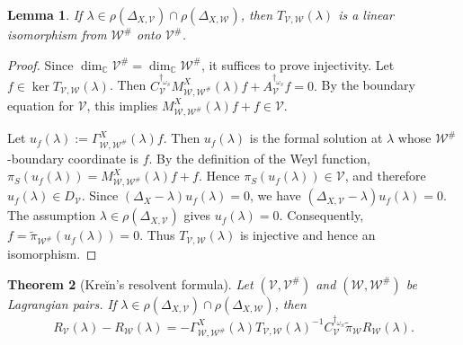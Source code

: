 \documentclass[12pt]{amsart}
\theoremstyle{plain}
\newtheorem{thm}{Theorem}[section]
\newtheorem{lem}[thm]{Lemma}
\theoremstyle{definition}
\theoremstyle{remark}
\numberwithin{equation}{section} \numberwithin{figure}{section}
\newcommand{\mb}[1]{\mathbb{#1}} %
\begin{document}
\begin{lem}\label{lem:boundary-operator-invertible}
If
\(\lambda\in
\rho(\Delta_{X,\mathcal V})
\cap\rho(\Delta_{X,\mathcal W})\), then
\(T_{\mathcal V,\mathcal W}(\lambda)\) is a linear isomorphism from
\(\mathcal W^\#\) onto \(\mathcal V^\#\).
\end{lem}

\begin{proof}
Since
\(\dim_{\mb C}\mathcal V^\#
=\dim_{\mb C}\mathcal W^\#\), it suffices to prove injectivity.
Let \(f\in\ker T_{\mathcal V,\mathcal W}(\lambda)\). Then
\(
C_{\mathcal V}^{\dagger_{\omega_S}}
M_{\mathcal W,\mathcal W^\#}^{X}(\lambda)f
+
A_{\mathcal V}^{\dagger_{\omega_S}}f
=0.
\)
By the boundary equation for \(\mathcal V\), this implies
\(
M_{\mathcal W,\mathcal W^\#}^{X}(\lambda)f+f
\in\mathcal V.
\)

Let
\(u_f(\lambda):=
\Gamma_{\mathcal W,\mathcal W^\#}^{X}(\lambda)f\).
Then \(u_f(\lambda)\) is the formal solution at \(\lambda\) whose
\(\mathcal W^\#\)-boundary coordinate is \(f\). By the definition of
the Weyl function,
\(
\pi_S(u_f(\lambda))
=
M_{\mathcal W,\mathcal W^\#}^{X}(\lambda)f+f.
\)
Hence \(\pi_S(u_f(\lambda))\in\mathcal V\), and therefore
\(u_f(\lambda)\in D_{\mathcal V}\). Since
\((\Delta_X-\lambda)u_f(\lambda)=0\), we have
\(
(\Delta_{X,\mathcal V}-\lambda)u_f(\lambda)=0.
\)
The assumption
\(\lambda\in\rho(\Delta_{X,\mathcal V})\) gives
\(u_f(\lambda)=0\). Consequently,
\(f=\widetilde{\pi}_{\mathcal W^\#}(u_f(\lambda))=0\).
Thus \(T_{\mathcal V,\mathcal W}(\lambda)\) is injective and hence
an isomorphism.
\end{proof}

\begin{thm}[Kreĭn's resolvent formula]
\label{thm:Krein-resolvent-formula}
Let \((\mathcal V,\mathcal V^\#)\) and
\((\mathcal W,\mathcal W^\#)\) be Lagrangian pairs. If
\(\lambda\in
\rho(\Delta_{X,\mathcal V})
\cap\rho(\Delta_{X,\mathcal W})\), then
\[
R_{\mathcal V}(\lambda)-R_{\mathcal W}(\lambda)
=
-\Gamma_{\mathcal W,\mathcal W^\#}^{X}(\lambda)
T_{\mathcal V,\mathcal W}(\lambda)^{-1}
C_{\mathcal V}^{\dagger_{\omega_S}}
\widetilde{\pi}_{\mathcal W}
R_{\mathcal W}(\lambda).
\]
\end{thm}
\end{document}
